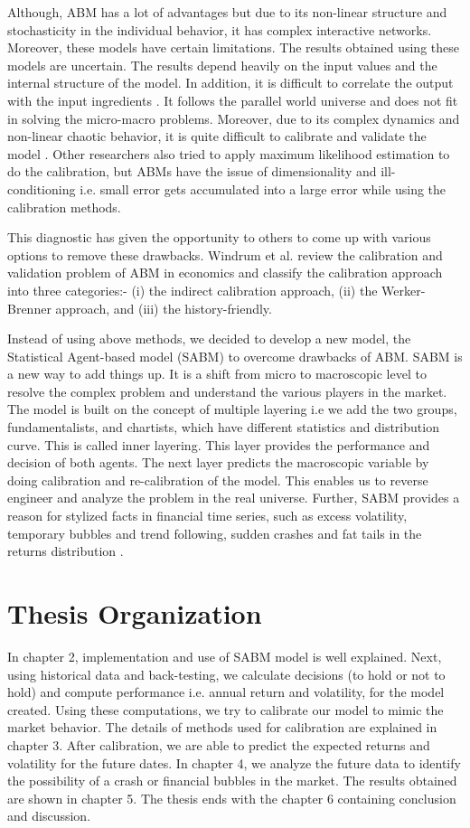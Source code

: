Although, ABM has a lot of advantages but due to its non-linear structure and stochasticity in the individual behavior, it has complex interactive networks. Moreover, these models have certain limitations. The results obtained using these models are uncertain. The results depend heavily on the input values and the internal structure of the model. In addition, it is difficult to correlate the output with the input ingredients \cite{yukalov}. It follows the parallel world universe and does not fit in solving the micro-macro problems. Moreover, due to its complex dynamics and non-linear chaotic behavior, it is quite difficult to calibrate and validate the model \cite{ising}. Other researchers also tried to apply maximum likelihood estimation to do the calibration, but ABMs have the issue of dimensionality and ill-conditioning i.e. small error gets accumulated into a large error while using the calibration methods.

This diagnostic has given the opportunity to others to come up with various options to remove these drawbacks. Windrum et al. \cite{windrum} review the calibration and validation problem of ABM in economics and classify the calibration approach into three categories:- (i) the indirect calibration approach, (ii) the Werker-Brenner approach, and (iii) the history-friendly.

Instead of using above methods, we decided to develop a new model, the Statistical Agent-based model (SABM) to overcome drawbacks of ABM. SABM is a new way to add things up. It is a shift from micro to macroscopic level to resolve the complex problem and understand the various players in the market. The model is built on the concept of multiple layering i.e we add the two groups, fundamentalists, and chartists, which have different statistics and distribution curve. This is called inner layering. This layer provides the performance and decision of both agents. The next layer predicts the macroscopic variable by doing calibration and re-calibration of the model. This enables us to reverse engineer and analyze the problem in the real universe. Further, SABM provides a reason for stylized facts in financial time series, such as excess volatility, temporary bubbles and trend following, sudden crashes and fat tails in the returns distribution \cite{ising}.

\section{Thesis Organization}
In chapter 2, implementation and use of SABM model is well explained. Next, using historical data and back-testing, we calculate decisions (to hold or not to hold) and compute performance i.e. annual return and volatility, for the model created. Using these computations, we try to calibrate our model to mimic the market behavior.  The details of methods used for calibration are explained in chapter 3. After calibration, we are able to predict the expected returns and volatility for the future dates. In chapter 4, we analyze the future data to identify the possibility of a crash or financial bubbles in the market. The results obtained are shown in chapter 5. The thesis ends with the chapter 6 containing conclusion and discussion. 

